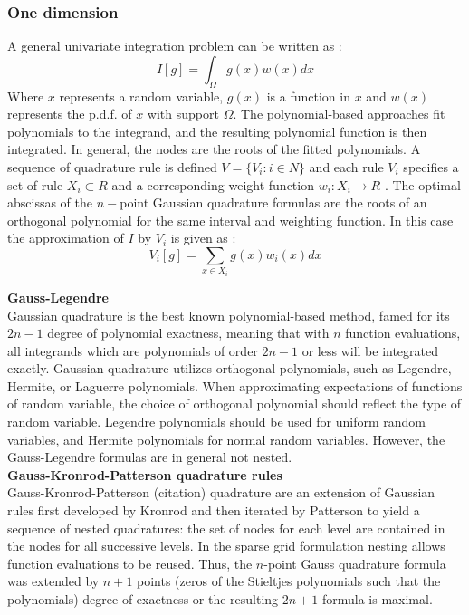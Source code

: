 \documentclass{article}
\begin{document}
\subsubsection{One dimension}
A general univariate integration problem can be written as :
\begin{equation}
I[g] = \int_{\Omega} g(x) w(x) dx
\end{equation}
Where $x$ represents a random variable, $g(x)$ is a function in $x$ and $w(x)$ 
represents the p.d.f. of $x$ with support $\Omega$.
The polynomial-based approaches fit polynomials to the integrand, and the resulting polynomial 
function is then integrated. In general, the nodes are the roots of the fitted polynomials.
A sequence of quadrature rule is defined $V = \{V_i : i\in N\}$ and each
 rule $V_i$ specifies a set of rule $X_i \subset R$ and a corresponding weight 
 function $w_i :X_i \longrightarrow R$ . The optimal abscissas of the
 $n-$point Gaussian quadrature formulas are the roots of an orthogonal polynomial
 for the same interval and weighting function. In this case the approximation of $I$ by $V_i$ 
 is given as : 
\begin{equation}
V_i[g] =\sum_{x \in X_i}g(x) w_i(x) dx
\end{equation}

\textbf{Gauss-Legendre } \\ 
Gaussian quadrature is the best known polynomial-based method, famed for its $2n-1$ degree of 
polynomial exactness, meaning that with $n$ function evaluations, all integrands which are 
polynomials of order $2n -1$ or less will be integrated exactly. Gaussian quadrature utilizes 
orthogonal polynomials, such as Legendre, Hermite, or Laguerre polynomials. When approximating
expectations of functions of random variable, the choice of orthogonal polynomial should reflect the
type of random variable. Legendre polynomials should be used for uniform random variables, and 
Hermite polynomials for normal random variables. However, the Gauss-Legendre formulas are in
general not nested.\\

\textbf{Gauss-Kronrod-Patterson quadrature rules}\\
Gauss-Kronrod-Patterson (citation) quadrature are an extension of Gaussian rules first developed by
Kronrod and then iterated by Patterson to yield a sequence of nested quadratures: the set of
nodes for each level are contained in the nodes for all successive levels. In the sparse grid 
formulation nesting allows function evaluations to be reused. 
Thus, the $n$-point Gauss quadrature formula was extended by $n+1$ points (zeros of the Stieltjes
polynomials such that the polynomials) degree of exactness or the resulting $2n+1$ formula is maximal.\\
\end{document}
